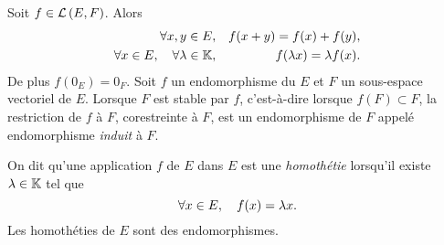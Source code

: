 \documentclass{magnoliaold}
\begin{document}
\begin{remarques}
\remarque Soit $f\in\mathcal{L}\left(E,F\right)$. Alors
\begin{eqnarray*}
\forall x,y\in E,& & f(x+y)=f(x)+f(y),\\
\forall x\in E,\quad \forall \lambda\in\mathbb{K},& & f(\lambda x)=\lambda f(x).
\end{eqnarray*}
De plus $f(0_E)=0_F$.
\remarque Soit $f$ un endomorphisme du \Kev $E$ et $F$ un sous-espace
  vectoriel de $E$. Lorsque $F$ est stable par $f$, c'est-à-dire
  lorsque $f(F)\subset F$, la restriction de $f$ à $F$, corestreinte à $F$, est
  un endomorphisme de $F$ appelé endomorphisme \emph{induit} à $F$.
\end{remarques}


\begin{definition}[utile=-2]
On dit qu'une application $f$ de $E$ dans $E$ est une \emph{homothétie} lorsqu'il
existe $\lambda\in\mathbb{K}$ tel que
\[\forall x\in E ,\quad f(x)=\lambda x.\]
Les homothéties de $E$ sont des endomorphismes.
\end{definition}
\end{document}

